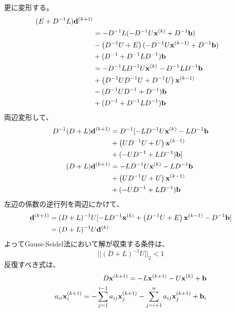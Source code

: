 \documentclass{jsarticle}
\newcommand{\kakko}[1][]{(#1)}
\newcommand{\bx}{\bold{x}}
\newcommand{\bb}{\bold{b}}
\newcommand{\bd}{\bold{d}}
\begin{document}
更に変形する。
\begin{align*}
  (E + D^{-1}L)\bd^{\kakko[k+1]} \\ 
& = - D^{-1}L (- D^{-1} U \bx^{\kakko[k]} + D^{-1}\bold{b})\\
&- \left( D^{-1}U+ E\right) (- D^{-1} U \bx^{\kakko[k-1]} + D^{-1}\bold{b})\\
&+ (D^{-1} + D^{-1} L D^{-1}) \bb\\
&=  - D^{-1}L D^{-1} U \bx^{\kakko[k]} - D^{-1}L D^{-1}\bold{b}\\
&+ \left( D^{-1}UD^{-1} U+ D^{-1} U\right)  \bx^{\kakko[k-1]} \\
&-( D^{-1}UD^{-1} + D^{-1})\bold{b}\\
&+ (D^{-1} + D^{-1} L D^{-1})\bb
\end{align*}
両辺変形して、
\begin{align*}
D^{-1}(D + L)\bd^{\kakko[k+1]} &= D^{-1} [-L D^{-1} U \bx^{\kakko[k]} - L D^{-1}\bold{b}\\
&+ \left( UD^{-1} U+ U\right)  \bx^{\kakko[k-1]} \\
&+(-UD^{-1} + LD^{-1})\bold{b}]\\
(D + L)\bd^{\kakko[k+1]}&= - L D^{-1} U \bx^{\kakko[k]} - L D^{-1}\bold{b}\\
&+ \left( UD^{-1} U+ U\right)  \bx^{\kakko[k-1]} \\
& + (-UD^{-1} + LD^{-1})\bold{b}\\
\end{align*}
左辺の係数の逆行列を両辺にかけて、
\begin{align*}
\bd^{\kakko[k+1]} &= (D + L)^{-1}U[- L D^{-1}  \bx^{\kakko[k]} + \left( D^{-1} U+ E\right) \bx^{\kakko[k-1]}
-D^{-1}\bold{b}]\\
&= (D + L)^{-1}U\bd^{\kakko[k]}\\
\end{align*}
よってGauss-Seidel法において解が収束する条件は、
\begin{equation}
    ||(D + L)^{-1}U||_2 < 1
\end{equation}
反復すべき式は、
\begin{align}
    D\bx^{\kakko[k+1]} = - L\bx^{\kakko[k+1]} - U\bx^{\kakko[k]}+\bb\\
    a_{ii}\bx^{\kakko[k+1]}_i =
    - \sum^{i-1}_{j=1} a_{ij}\bx^{\kakko[k+1]}_j- \sum^{n}_{j=i+1}a_{ij}\bx^{\kakko[k+1]}_j+\bb_i
\end{align}
\end{document}
